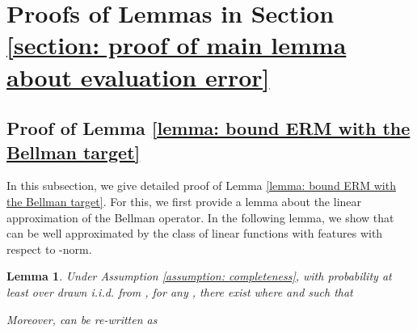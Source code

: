\documentclass{article} \usepackage{iclr2023/iclr2023_conference,times}
\newtheorem{lemma}{Lemma}[section]
\begin{document}
 \section{Proofs of Lemmas in Section \ref{section: proof of main lemma about evaluation error}}
\label{section: proofs of intermediate lemmas for the main lemmas}


\subsection{Proof of Lemma \ref{lemma: bound ERM with the Bellman target}}
\label{subsection: proof of lemma D1}

In this subsection, we give detailed proof of Lemma \ref{lemma: bound ERM with the Bellman target}. For this, we first provide a lemma about the linear approximation of the Bellman operator. In the following lemma, we show that  can be well approximated by the class of linear functions with features  with respect to -norm. 
\begin{lemma}
Under Assumption \ref{assumption: completeness}, with probability at least  over  drawn i.i.d. from , for any , there exist  where  and  such that 


Moreover,  can be re-written as 

\label{lemma: linear approximation for the Bellman target}
\end{lemma}
\end{document}
